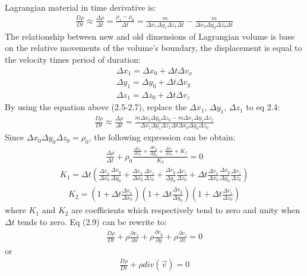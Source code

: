Lagrangian material in time derivative is:
\begin{align}
\frac{D\rho}{Dt} \approx \frac{\Delta \rho}{\Delta t} = \frac{\rho_1-\rho_0}{\Delta t}=\frac{m}{\Delta x_1 \Delta y_1 \Delta z_1\Delta t}-\frac{m}{\Delta x_0 \Delta y_0 \Delta z_0\Delta t}
\end{align}
The relationship between new and old dimensions of Lagrangian volume is base on the relative movements of the volume's boundary, the displacement is equal to the velocity times period of duration:
\begin{align}
\Delta x_1 = \Delta x_0+\Delta t\Delta v_x\\
\Delta y_1 = \Delta y_0+\Delta t\Delta v_y\\
\Delta z_1 = \Delta z_0+\Delta t\Delta v_z
\end{align}
By using the equation above (2.5-2.7), replace the $\Delta x_1$, $\Delta y_1$, $\Delta z_1$ to eq 2.4:
\begin{align}
\frac{D\rho}{Dt} \approx \frac{\Delta \rho}{\Delta t} =\frac{m\Delta x_0 \Delta y_0 \Delta z_0-m\Delta x_1 \Delta y_1 \Delta z_1}{\Delta x_1 \Delta y_1 \Delta z_1\Delta t\Delta x_0 \Delta y_0 \Delta z_0}
\end{align}
Since $\Delta x_0 \Delta y_0 \Delta z_0=\rho_0$, the following expression can be obtain:
\begin{align}
\frac{\Delta \rho}{\Delta t}+\rho_0\frac{\frac{\Delta v_x}{\Delta x_0}+\frac{\Delta v_y}{\Delta y_0}+\frac{\Delta v_z}{\Delta z_0}+K_1}{K_2} = 0
\end{align}
\begin{align}
K_1 = \Delta t(\frac{\Delta v_x}{\Delta x_0}\frac{\Delta v_y}{\Delta y_0}+\frac{\Delta v_x}{\Delta x_0}\frac{\Delta v_z}{\Delta z_0}+\frac{\Delta v_y}{\Delta y_0}\frac{\Delta v_z}{\Delta z_0}+\Delta t \frac{\Delta v_x}{\Delta x_0}\frac{\Delta v_y}{\Delta y_0}\frac{\Delta v_z}{\Delta z_0})
\end{align}
\begin{align}
K_2=(1+\Delta t\frac{\Delta v_x}{\Delta x_0})(1+\Delta t\frac{\Delta v_y}{\Delta y_0})(1+\Delta t\frac{\Delta v_z}{\Delta z_0})
\end{align}
where $K_1$ and $K_2$ are coefficients which respectively tend to zero and unity when $\Delta t$ tends to zero. Eq (2.9) can be rewrite to:
\begin{align}
\frac{D\rho}{Dt}+\rho\frac{\partial v_x}{\partial x}+\rho\frac{\partial v_y}{\partial y}+\rho\frac{\partial v_z}{\partial z} = 0
\end{align}
or
\begin{align}
\frac{D\rho}{Dt}+\rho div(\vec v) = 0
\end{align}

